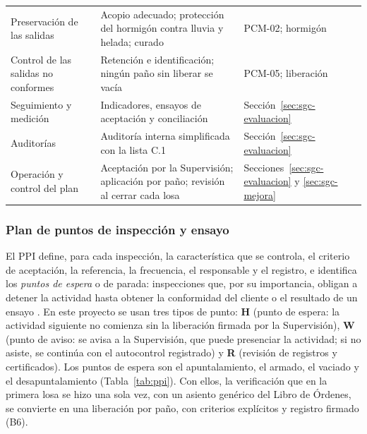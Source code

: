 \begin{longtable}{@{}P{4.4cm}P{8.6cm}P{2.7cm}@{}}
Preservación de las salidas & Acopio adecuado; protección del hormigón contra lluvia y helada; curado & PCM-02; hormigón \\
Control de las salidas no conformes & Retención e identificación; ningún paño sin liberar se vacía & PCM-05; liberación \\
Seguimiento y medición & Indicadores, ensayos de aceptación y conciliación & Sección~\ref{sec:sgc-evaluacion} \\
Auditorías & Auditoría interna simplificada con la lista C.1 & Sección~\ref{sec:sgc-evaluacion} \\
Operación y control del plan & Aceptación por la Supervisión; aplicación por paño; revisión al cerrar cada losa & Secciones~\ref{sec:sgc-evaluacion} y \ref{sec:sgc-mejora} \\
\end{longtable}
\vspace{-6pt}
\endgroup

\subsubsection{Plan de puntos de inspección y ensayo} El PPI define, para cada inspección, la característica que se controla, el criterio de aceptación, la referencia, la frecuencia, el responsable y el registro, e identifica los \emph{puntos de espera} o de parada: inspecciones que, por su importancia, obligan a detener la actividad hasta obtener la conformidad del cliente o el resultado de un ensayo \parencite[anexo~4]{muro2020}. En este proyecto se usan tres tipos de punto: \textbf{H} (punto de espera: la actividad siguiente no comienza sin la liberación firmada por la Supervisión), \textbf{W} (punto de aviso: se avisa a la Supervisión, que puede presenciar la actividad; si no asiste, se continúa con el autocontrol registrado) y \textbf{R} (revisión de registros y certificados). Los puntos de espera son el apuntalamiento, el armado, el vaciado y el desapuntalamiento (Tabla~\ref{tab:ppi}). Con ellos, la verificación que en la primera losa se hizo una sola vez, con un asiento genérico del Libro de Órdenes, se convierte en una liberación por paño, con criterios explícitos y registro firmado (B6).

